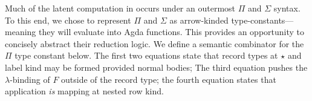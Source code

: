 \documentclass[authoryear, acmsmall, screen, review, nonacm]{acmart}
\begin{document}
\begin{code}%
\>[0]\AgdaSpace{}%
\AgdaSymbol{:}\AgdaSpace{}%
\AgdaSpace{}%
\AgdaSpace{}%
\AgdaSpace{}%
\AgdaSpace{}%
\AgdaSpace{}%
\AgdaSpace{}%
\AgdaSymbol{((}\AgdaSpace{}%
\AgdaSpace{}%
\AgdaSymbol{)}\AgdaSpace{}%
\AgdaSpace{}%
\AgdaSymbol{)}\<%
\\
\>[0]\AgdaSpace{}%
\AgdaSpace{}%
\AgdaSymbol{=}\AgdaSpace{}%
\AgdaSpace{}%
\AgdaSpace{}%
\AgdaSpace{}%
\AgdaSpace{}%
\AgdaSpace{}%
\AgdaSpace{}%
\AgdaSymbol{(}\AgdaSpace{}%
\AgdaSpace{}%
\AgdaSymbol{)}\<%
\\
%
\\[\AgdaEmptyExtraSkip]%
\>[0]\AgdaSpace{}%
\AgdaSpace{}%
\<%
\\
\>[0]\AgdaSpace{}%
\AgdaSymbol{:}\AgdaSpace{}%
\AgdaSpace{}%
\AgdaSpace{}%
\AgdaOperator{\AgdaInductiveConstructor{R[}}\AgdaSpace{}%
\AgdaSpace{}%
\AgdaSpace{}%
\AgdaSpace{}%
\AgdaOperator{\AgdaInductiveConstructor{]}}\AgdaSpace{}%
\AgdaSpace{}%
\AgdaSpace{}%
\AgdaSpace{}%
\AgdaSpace{}%
\AgdaSpace{}%
\AgdaSpace{}%
\AgdaSpace{}%
\AgdaOperator{\AgdaInductiveConstructor{R[}}\AgdaSpace{}%
\AgdaSpace{}%
\AgdaOperator{\AgdaInductiveConstructor{]}}\<%
\\
\>[0]\AgdaSpace{}%
\AgdaSpace{}%
\AgdaSpace{}%
\AgdaSymbol{=}\AgdaSpace{}%
\AgdaSpace{}%
\AgdaSpace{}%
\AgdaSpace{}%
\<%
\end{code}

Much of the latent computation in \Rome occurs under an outermost $\Pi$ and $\Sigma$ syntax. To this end, we chose to represent $\Pi$ and $\Sigma$ as arrow-kinded type-constants---meaning they will evaluate into Agda functions. This provides an opportunity to concisely abstract their reduction logic. We define a semantic combinator for the $\Pi$ type constant below. The first two equations state that record types at $\star$ and label kind may be formed provided normal bodies; The third equation pushes the $\lambda$-binding of $F$ outside of the record type; the fourth equation states that application \emph{is} mapping at nested row kind.
\end{document}
